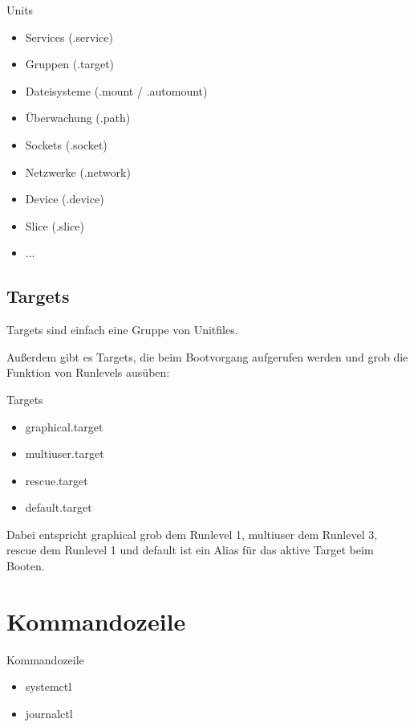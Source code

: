 \begin{frame}{Units}
  \begin{itemize}
  \item Services (.service)
  \item Gruppen (.target)
  \item Dateisysteme (.mount / .automount)
  \item Überwachung (.path)
  \item Sockets (.socket)
  \item Netzwerke (.network)
  \item Device (.device)
  \item Slice (.slice)
  \item ...
\end{itemize}
\end{frame}

\subsection{Targets}
Targets sind einfach eine Gruppe von Unitfiles.

Außerdem gibt es Targets, die beim Bootvorgang aufgerufen werden und grob
die Funktion von Runlevels ausüben:

\begin{frame}[fragile]{Targets}
  \begin{itemize}
  \item graphical.target
  \item multiuser.target
  \item rescue.target
  \item default.target
  \end{itemize}
\end{frame}

Dabei entspricht graphical grob dem Runlevel 1, multiuser dem Runlevel 3,
rescue dem Runlevel 1 und default ist ein Alias für das aktive Target
beim Booten.

\section{Kommandozeile}

\begin{frame}{Kommandozeile}
  \begin{itemize}
  \item systemctl
  \item journalctl
  \end{itemize}
\end{frame}

